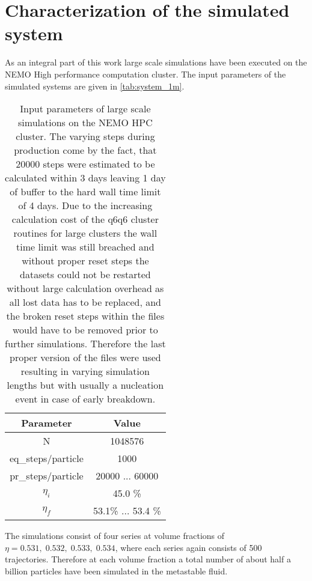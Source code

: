 
\label{chp:data_analysis}
\section{Characterization of the simulated system}
\label{sec:system_choice}
As an integral part of this work large scale simulations have been executed on the NEMO High performance computation cluster. The input parameters of the simulated systems are given in \autoref{tab:system_1m}.

\begin{table}[ht]
\centering
\begin{tabular}{c|c}
Parameter & Value \\ \hline
N & 1048576 \\
eq\_steps/particle & 1000 \\
pr\_steps/particle & 20000  ... 60000 \\
$\eta_i$ & 45.0 \% \\
$\eta_f$ & 53.1\% ... 53.4 \% \\
\end{tabular}
\caption[Simulation parameters of data production systems]{Input parameters of large scale simulations on the NEMO HPC cluster. The varying steps during production come by the fact, that 20000 steps were estimated to be calculated within 3 days leaving 1 day of buffer to the hard wall time limit of 4 days. Due to the increasing calculation cost of the q6q6 cluster routines for large clusters the wall time limit was still breached and without proper reset steps the datasets could not be restarted without large calculation overhead as all lost data has to be replaced, and the broken reset steps within the files would have to be removed prior to further simulations. Therefore the last proper version of the files were used resulting in varying simulation lengths but with usually a nucleation event in case of early breakdown.}
\label{tab:system_1m}
\end{table}

The simulations consist of four series at volume fractions of $\eta = 0.531,\;0.532,\;0.533,\;0.534$, where each series again consists of 500 trajectories. Therefore at each volume fraction a total number of about half a billion particles have been simulated in the metastable fluid.\\

